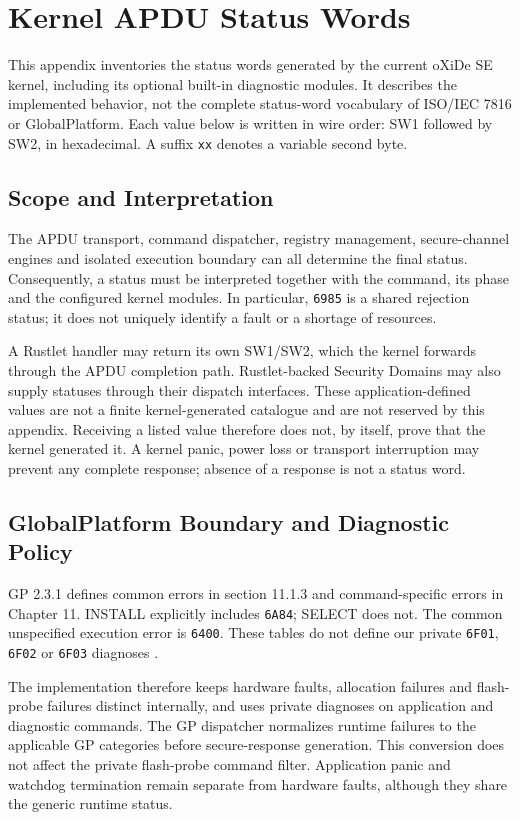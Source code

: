 \chapter{Kernel APDU Status Words}
\label{app:kernel-status-words}

This appendix inventories the status words generated by the current oXiDe SE
kernel, including its optional built-in diagnostic modules. It describes the
implemented behavior, not the complete status-word vocabulary of ISO/IEC 7816
or GlobalPlatform. Each value below is written in wire order: SW1 followed by
SW2, in hexadecimal. A suffix \texttt{xx} denotes a variable second byte.

\section{Scope and Interpretation}

The APDU transport, command dispatcher, registry management, secure-channel
engines and isolated execution boundary can all determine the final status.
Consequently, a status must be interpreted together with the command, its
phase and the configured kernel modules. In particular, \texttt{6985} is a
shared rejection status; it does not uniquely identify a fault or a shortage
of resources.

A Rustlet handler may return its own SW1/SW2, which the kernel forwards through
the APDU completion path. Rustlet-backed Security Domains may also supply
statuses through their dispatch interfaces. These application-defined values
are not a finite kernel-generated catalogue and are not reserved by this
appendix. Receiving a listed value therefore does not, by itself, prove that
the kernel generated it. A kernel panic, power loss or transport interruption
may prevent any complete response; absence of a response is not a status word.

\section{GlobalPlatform Boundary and Diagnostic Policy}

GP 2.3.1 defines common errors in section 11.1.3 and command-specific errors
in Chapter 11. INSTALL explicitly includes \texttt{6A84}; SELECT does not.
The common unspecified execution error is \texttt{6400}. These tables do not
define our private \texttt{6F01}, \texttt{6F02} or \texttt{6F03} diagnoses
\cite{gp-card}.

The implementation therefore keeps hardware faults, allocation failures and
flash-probe failures distinct internally, and uses private diagnoses on
application and diagnostic commands. The GP dispatcher normalizes runtime
failures to the applicable GP categories before secure-response generation.
This conversion does not affect the private flash-probe command filter.
Application panic and watchdog termination remain separate from hardware
faults, although they share the generic runtime status.

